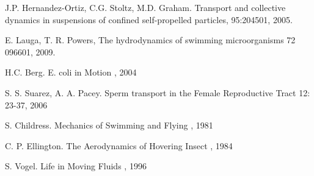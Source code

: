 %
\begin{thebibliography}{99}

J.P. Hernandez-Ortiz, C.G. Stoltz, M.D. Graham.
\newblock Transport and collective dynamics in suspensions of confined self-propelled particles,
 95:204501, 2005.

E. Lauga, T. R. Powers,
\newblock The hydrodynamics of swimming microorganisms
 72 096601, 2009.

H.C. Berg.
\newblock E. coli in Motion
, 2004

S. S. Suarez, A. A. Pacey.
\newblock Sperm transport in the Female Reproductive Tract
 12: 23-37, 2006

S. Childress.
\newblock Mechanics of Swimming and Flying
, 1981

C. P. Ellington.
\newblock The Aerodynamics of Hovering Insect
, 1984

S. Vogel.
\newblock Life in Moving Fluids
, 1996



\end{thebibliography}

